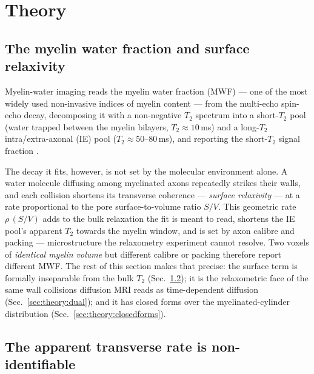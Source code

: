 \section{Theory}
\label{sec:theory}

\subsection{The myelin water fraction and surface relaxivity}
\label{sec:theory:mwf}

Myelin-water imaging reads the myelin water fraction (MWF) --- one of the most widely
used non-invasive indices of myelin content --- from the multi-echo spin-echo decay,
decomposing it with a non-negative $T_2$ spectrum into a short-$T_2$ pool (water trapped
between the myelin bilayers, $T_2\!\approx\!10$\,ms) and a long-$T_2$ intra/extra-axonal
(IE) pool ($T_2\!\approx\!50$--$80$\,ms), and reporting the short-$T_2$ signal fraction
\citep{Mackay1994, Whittall1997, Laule2007, Prasloski2012}.

The decay it fits, however, is not set by the molecular environment alone. A water
molecule diffusing among myelinated axons repeatedly strikes their walls, and each
collision shortens its transverse coherence --- \emph{surface relaxivity}
\citep{Brownstein1979} --- at a rate proportional to the pore surface-to-volume ratio
$S/V$. This geometric rate $\rho\,(S/V)$ adds to the bulk relaxation the fit is meant to
read, shortens the IE pool's apparent $T_2$ towards the myelin window, and is set by
axon calibre and packing --- microstructure the relaxometry experiment cannot resolve.
Two voxels of \emph{identical myelin volume} but different calibre or packing therefore
report different MWF. The rest of this section makes that precise: the surface term is
formally inseparable from the bulk $T_2$ (Sec.~\ref{sec:theory:inseparability}); it is
the relaxometric face of the same wall collisions diffusion MRI reads as time-dependent
diffusion (Sec.~\ref{sec:theory:dual}); and it has closed forms over the
myelinated-cylinder distribution (Sec.~\ref{sec:theory:closedforms}).

\subsection{The apparent transverse rate is non-identifiable}
\label{sec:theory:inseparability}

